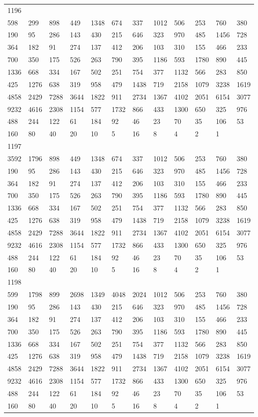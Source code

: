 \begin{longtable}{llllllllllll}
1196&&&&&&&&&&&\\
598& 299& 898& 449& 1348& 674& 337& 1012& 506& 253& 760& 380\\
190& 95& 286& 143& 430& 215& 646& 323& 970& 485& 1456& 728\\
364& 182& 91& 274& 137& 412& 206& 103& 310& 155& 466& 233\\
700& 350& 175& 526& 263& 790& 395& 1186& 593& 1780& 890& 445\\
1336& 668& 334& 167& 502& 251& 754& 377& 1132& 566& 283& 850\\
425& 1276& 638& 319& 958& 479& 1438& 719& 2158& 1079& 3238& 1619\\
4858& 2429& 7288& 3644& 1822& 911& 2734& 1367& 4102& 2051& 6154& 3077\\
9232& 4616& 2308& 1154& 577& 1732& 866& 433& 1300& 650& 325& 976\\
488& 244& 122& 61& 184& 92& 46& 23& 70& 35& 106& 53\\
160& 80& 40& 20& 10& 5& 16& 8& 4& 2& 1& \\

1197&&&&&&&&&&&\\
3592& 1796& 898& 449& 1348& 674& 337& 1012& 506& 253& 760& 380\\
190& 95& 286& 143& 430& 215& 646& 323& 970& 485& 1456& 728\\
364& 182& 91& 274& 137& 412& 206& 103& 310& 155& 466& 233\\
700& 350& 175& 526& 263& 790& 395& 1186& 593& 1780& 890& 445\\
1336& 668& 334& 167& 502& 251& 754& 377& 1132& 566& 283& 850\\
425& 1276& 638& 319& 958& 479& 1438& 719& 2158& 1079& 3238& 1619\\
4858& 2429& 7288& 3644& 1822& 911& 2734& 1367& 4102& 2051& 6154& 3077\\
9232& 4616& 2308& 1154& 577& 1732& 866& 433& 1300& 650& 325& 976\\
488& 244& 122& 61& 184& 92& 46& 23& 70& 35& 106& 53\\
160& 80& 40& 20& 10& 5& 16& 8& 4& 2& 1& \\

1198&&&&&&&&&&&\\
599& 1798& 899& 2698& 1349& 4048& 2024& 1012& 506& 253& 760& 380\\
190& 95& 286& 143& 430& 215& 646& 323& 970& 485& 1456& 728\\
364& 182& 91& 274& 137& 412& 206& 103& 310& 155& 466& 233\\
700& 350& 175& 526& 263& 790& 395& 1186& 593& 1780& 890& 445\\
1336& 668& 334& 167& 502& 251& 754& 377& 1132& 566& 283& 850\\
425& 1276& 638& 319& 958& 479& 1438& 719& 2158& 1079& 3238& 1619\\
4858& 2429& 7288& 3644& 1822& 911& 2734& 1367& 4102& 2051& 6154& 3077\\
9232& 4616& 2308& 1154& 577& 1732& 866& 433& 1300& 650& 325& 976\\
488& 244& 122& 61& 184& 92& 46& 23& 70& 35& 106& 53\\
160& 80& 40& 20& 10& 5& 16& 8& 4& 2& 1& \\


\end{longtable}

